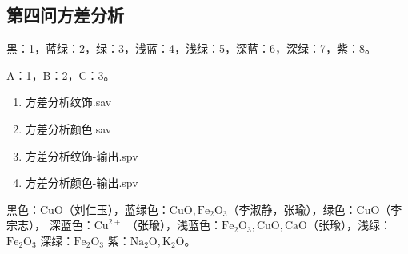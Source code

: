 \documentclass[12pt,a4paper,oneside]{ctexart}
\begin{document}
    \subsection*{第四问方差分析}
    黑：1，蓝绿：2，绿：3，浅蓝：4，浅绿：5，深蓝：6，深绿：7，紫：8。

    A：1，B：2，C：3。

    \begin{enumerate}[(1)]
        \item 方差分析纹饰.sav
        \item 方差分析颜色.sav
        \item 方差分析纹饰-输出.spv
        \item 方差分析颜色-输出.spv
    \end{enumerate}

    黑色：$\mathrm{CuO}$（刘仁玉），蓝绿色：$\mathrm{CuO},\mathrm{Fe_2O_3}$（李淑静，张瑜），绿色：$\mathrm{CuO}$（李宗志）， 深蓝色：$\mathrm{Cu}^{2+}$
    （张瑜），浅蓝色：$\mathrm{Fe_2O_3},\mathrm{CuO},\mathrm{CaO}$（张瑜），浅绿：$\mathrm{Fe_2O_3}$ 深绿：$\mathrm{Fe_2O_3}$ 紫：$\mathrm{Na_2O},\mathrm{K_2O}$。
\end{document}
